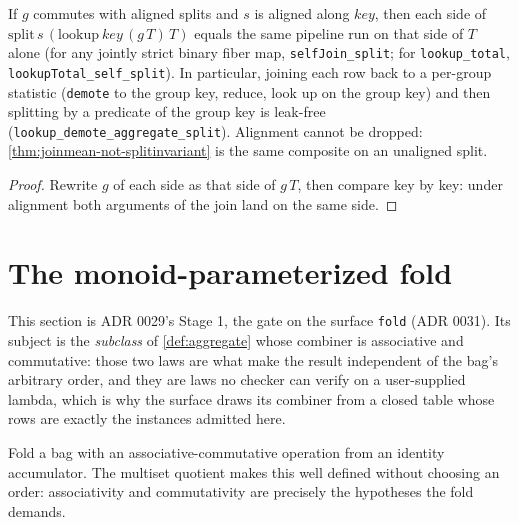 \begin{theorem}
  \label{thm:self-lookup-split}
  \leanok
  If $g$ commutes with aligned splits and $s$ is aligned along
  $\mathit{key}$, then each side of $\mathrm{split}\,s\,(\mathrm{lookup}\
  \mathit{key}\,(g\,T)\,T)$ equals the same pipeline run on that side of
  $T$ alone (for any jointly strict binary fiber map,
  \texttt{selfJoin\_split}; for \texttt{lookup\_total},
  \texttt{lookupTotal\_self\_split}).  In particular, joining each row
  back to a per-group statistic (\texttt{demote} to the group key,
  reduce, look up on the group key) and then splitting by a predicate of
  the group key is leak-free
  (\texttt{lookup\_demote\_aggregate\_split}).  Alignment cannot be dropped:
  \ref{thm:joinmean-not-splitinvariant} is the same composite on an
  unaligned split.
\end{theorem}
\begin{proof}\leanok
  Rewrite $g$ of each side as that side of $g\,T$, then compare key by
  key: under alignment both arguments of the join land on the same side.
\end{proof}

\section{The monoid-parameterized fold}

This section is ADR 0029's Stage 1, the gate on the surface \texttt{fold}
(ADR 0031).  Its subject is the \emph{subclass} of \ref{def:aggregate}
whose combiner is associative and commutative: those two laws are what make
the result independent of the bag's arbitrary order, and they are laws no
checker can verify on a user-supplied lambda, which is why the surface draws
its combiner from a closed table whose rows are exactly the instances
admitted here.

\begin{definition}
  \label{def:foldbag}\leanok
  Fold a bag with an associative-commutative operation from an identity
  accumulator.  The multiset quotient makes this well defined without
  choosing an order: associativity and commutativity are precisely the
  hypotheses the fold demands.
\end{definition}

